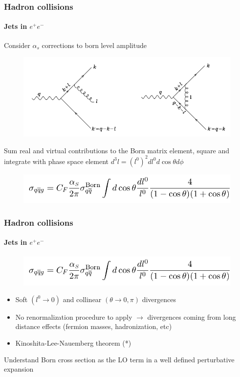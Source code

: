 \documentclass[aspectratio=43]{beamer}
\begin{document}
\begin{frame}

	\frametitle{Hadron collisions}
	\framesubtitle{Jets in $e^{+}e^{-}$}
	
	Consider $\alpha_{s}$ corrections to born level amplitude
	
	\begin{figure}
		\includegraphics[width = 7 cm]{plots/qcd_corrections_2.png}
	\end{figure}
	
	Sum real and virtual contributions to the Born matrix element, square and integrate with phase space element $d^{3}l = (l^{0})^{2} dl^{0} d\cos\theta d\phi$
	\begin{figure}
		\includegraphics[width = 9.5 cm]{plots/eq_qqbg.png}
	\end{figure}

\end{frame}

\begin{frame}

	\frametitle{Hadron collisions}
	\framesubtitle{Jets in $e^{+}e^{-}$}
	
	\begin{figure}
		\includegraphics[width = 9.5 cm]{plots/eq_qqbg.png}
	\end{figure}

	\begin{itemize}
		\item Soft $(l^{0} \rightarrow 0)$ and collinear $(\theta \rightarrow 0, \pi)$ divergences
		\item No renormalization procedure to apply $\rightarrow$ divergences coming from long distance effects (fermion masses, hadronization, etc)
		\item Kinoshita-Lee-Nauemberg theorem {\color{blue}(*)}
	\end{itemize}

	{\color{blue}Understand Born cross section as the LO term in a well defined perturbative expansion}
	
\end{frame}
\end{document}
